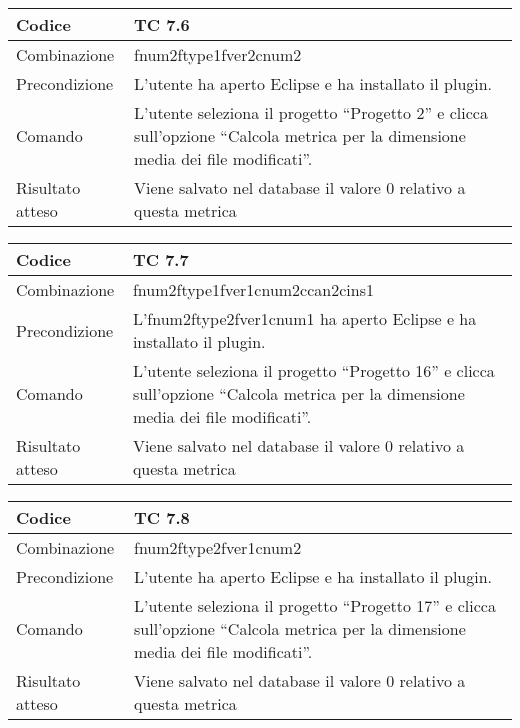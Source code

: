 \begin{table}[ht]
\begin{tabular}{|p{3cm}|p{9cm}|}
\hline
\cellcolor{lightgray}Codice				& TC 7.6								\\
\hline
\cellcolor{lightgray}Combinazione		& fnum2ftype1fver2cnum2								\\
\hline
\cellcolor{lightgray}Precondizione		& L'utente ha aperto Eclipse e ha installato il plugin.				\\
\hline
\cellcolor{lightgray}Comando			& L'utente seleziona il progetto ``Progetto 2''  e clicca sull'opzione ``Calcola metrica per la dimensione media dei file modificati''.	\\
\hline
\cellcolor{lightgray}Risultato atteso	& Viene salvato nel database il valore 0 relativo a questa metrica	\\
\hline
\end{tabular}
\end{table}

\begin{table}[ht]
\begin{tabular}{|p{3cm}|p{9cm}|}
\hline
\cellcolor{lightgray}Codice				& TC 7.7								\\
\hline
\cellcolor{lightgray}Combinazione		& fnum2ftype1fver1cnum2ccan2cins1							\\
\hline
\cellcolor{lightgray}Precondizione		& L'fnum2ftype2fver1cnum1 ha aperto Eclipse e ha installato il plugin.									\\
\hline
\cellcolor{lightgray}Comando			& L'utente seleziona il progetto ``Progetto 16''  e clicca sull'opzione ``Calcola metrica per la dimensione media dei file modificati''.	\\
\hline
\cellcolor{lightgray}Risultato atteso	& Viene salvato nel database il valore 0 relativo a questa metrica	\\
\hline
\end{tabular}
\end{table}

\begin{table}[ht]
\begin{tabular}{|p{3cm}|p{9cm}|}
\hline
\cellcolor{lightgray}Codice				& TC 7.8								\\
\hline
\cellcolor{lightgray}Combinazione		& fnum2ftype2fver1cnum2 									\\
\hline
\cellcolor{lightgray}Precondizione		& L'utente ha aperto Eclipse e ha installato il plugin.				\\
\hline
\cellcolor{lightgray}Comando			& L'utente seleziona il progetto ``Progetto 17''  e clicca sull'opzione ``Calcola metrica per la dimensione media dei file modificati''.	\\
\hline
\cellcolor{lightgray}Risultato atteso	& Viene salvato nel database il valore 0 relativo a questa metrica	\\
\hline
\end{tabular}
\end{table}

